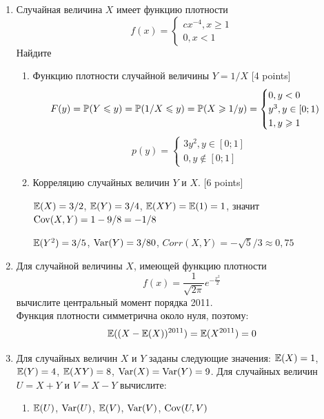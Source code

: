 \documentclass[12pt, a4paper]{article}\usepackage[]{graphicx}\usepackage[]{color}
\begin{document}
\begin{enumerate}
			\item Случайная величина $X$ имеет функцию плотности
			\begin{equation}
			f(x)=
			\begin{cases}
			cx^{-4}, x\geq 1 \\
			0, x<1
			\end{cases}
			\end{equation}
			Найдите
			\begin{enumerate}
				\item  Функцию плотности случайной величины $Y=1/X$ [4 points]
				\begin{equation}
				F(y)=\P(Y\leq y)=\P(1/X \leq y)=\P(X\geq 1/y)=
				\begin{cases}
				0, y<0 \\
				y^3, y\in [0;1) \\
				1, y \geq 1
				\end{cases}
				\end{equation}
				\begin{equation}
				p(y)=
				\begin{cases}
				3y^2, y\in [0;1]\\
				0, y\notin [0;1]
				\end{cases}
				\end{equation}


				\item  Корреляцию случайных величин $Y$ и $X$. [6 points]


				$\E(X)=3/2$, $\E(Y)=3/4$, $\E(XY)=\E(1)=1$, значит $\Cov(X,Y)=1-9/8=-1/8$

				$\E(Y^2)=3/5$, $\Var(Y)=3/80$, $Corr(X,Y)=-\sqrt{5}/3\approx 0{,}75$
			\end{enumerate}

			\item Для случайной величины $X$, имеющей функцию плотности
			\begin{equation}
			f(x)=\frac{1}{\sqrt{2\pi}}e^{-\frac{x^2}{2}}
			\end{equation}
			вычислите центральный момент порядка 2011.\\
			Функция плотности симметрична около нуля, поэтому:
			\begin{equation}
			\E((X-\E(X))^{2011})=\E(X^{2011})=0
			\end{equation}


			\item Для случайных величин $X$ и $Y$ заданы следующие значения: $\E(X)=1$, $\E(Y)=4$, $\E(XY)=8$, $\Var(X)=\Var(Y)=9$. Для случайных величин $U=X+Y$ и $V=X-Y$ вычислите:
			\begin{enumerate}
				\item $\E(U)$, $\Var(U)$, $\E(V)$, $\Var(V)$, $\Cov(U,V)$ \\


\end{enumerate}
\end{enumerate}
\end{document}
